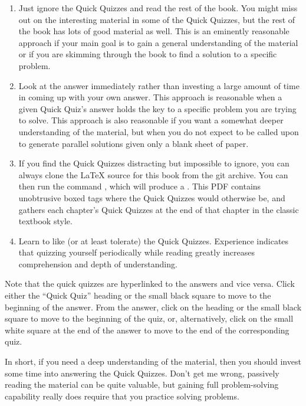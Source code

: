 {{\begin{enumerate}
\item	Just ignore the Quick Quizzes and read the rest of
	the book.
	You might miss out on the interesting material in
	some of the Quick Quizzes, but the rest of the book
	has lots of good material as well.
	This is an eminently reasonable approach if your main
	goal is to gain a general understanding of the material
	or if you are skimming through the book to find a
	solution to a specific problem.
\item	Look at the answer immediately rather than investing
	a large amount of time in coming up with your own
	answer.
	This approach is reasonable when a given Quick Quiz's
	answer holds the key to a specific problem you are
	trying to solve.
	This approach is also reasonable if you want a somewhat
	deeper understanding of the material, but when you do not
	expect to be called upon to generate parallel solutions given
	only a blank sheet of paper.
\item	If you find the Quick Quizzes distracting but impossible
	to ignore, you can always clone the \LaTeX{} source for
	this book from the git archive.
	You can then run the command , which will
	produce a .
	This PDF contains unobtrusive boxed tags where the Quick Quizzes
	would otherwise be, and gathers each chapter's Quick Quizzes
	at the end of that chapter in the classic textbook style.
\item	Learn to like (or at least tolerate) the Quick Quizzes.
	Experience indicates that quizzing yourself periodically
	while reading greatly increases comprehension and depth
	of understanding.
\end{enumerate}

Note that the quick quizzes are hyperlinked to the answers and vice versa.
Click either the ``Quick Quiz'' heading or the small black square
to move to the beginning of the answer.
From the answer, click on the heading or the small black square to
move to the beginning of the quiz, or, alternatively, click on the
small white square at the end of the answer to move to the end of the
corresponding quiz.
}\QuickQuizEndE
}

In short, if you need a deep
understanding of the material, then you should invest some time
into answering the Quick Quizzes.
Don't get me wrong, passively reading the material can be quite
valuable, but gaining full problem-solving capability really
does require that you practice solving problems.

